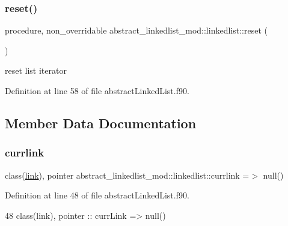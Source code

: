 \subsubsection{\texorpdfstring{reset()}{reset()}}
{\footnotesize\ttfamily procedure, non\+\_\+overridable abstract\+\_\+linkedlist\+\_\+mod\+::linkedlist\+::reset (\begin{DoxyParamCaption}{ }\end{DoxyParamCaption})\hspace{0.3cm}{\ttfamily [private]}}



reset list iterator 



Definition at line 58 of file abstract\+Linked\+List.\+f90.



\subsection{Member Data Documentation}
\mbox{\label{structabstract__linkedlist__mod_1_1linkedlist_a5039a762fe6e50feda0265f14386c478}} 
\subsubsection{\texorpdfstring{currlink}{currlink}}
{\footnotesize\ttfamily class(\mbox{\hyperlink{structlink__mod_1_1link}{link}}), pointer abstract\+\_\+linkedlist\+\_\+mod\+::linkedlist\+::currlink =$>$ null()\hspace{0.3cm}{\ttfamily [private]}}



Definition at line 48 of file abstract\+Linked\+List.\+f90.


\begin{DoxyCode}
48         \textcolor{keywordtype}{class}(link), \textcolor{keywordtype}{pointer} :: currLink => null()
\end{DoxyCode}
\mbox{\label{structabstract__linkedlist__mod_1_1linkedlist_a1db1fbb6e3acfb39a2cab68396f31867}} 
